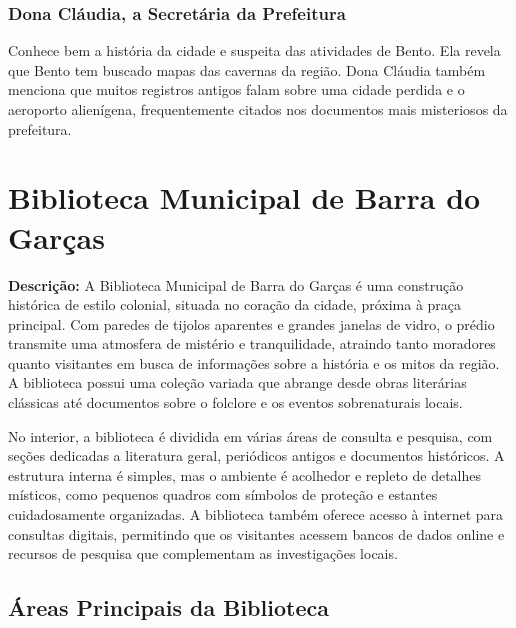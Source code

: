\begin{personagem}  
 \subsubsection{Dona Cláudia, a Secretária da Prefeitura}
 
 Conhece bem a história da cidade e suspeita das atividades de Bento. Ela revela que Bento tem buscado mapas das cavernas da região. Dona Cláudia também menciona que muitos registros antigos falam sobre uma cidade perdida e o aeroporto alienígena, frequentemente citados nos documentos mais misteriosos da prefeitura.
\end{personagem}
 
\section{Biblioteca Municipal de Barra do Garças}

\textbf{Descrição:}  
A Biblioteca Municipal de Barra do Garças é uma construção histórica de estilo colonial, situada no coração da cidade, próxima à praça principal. Com paredes de tijolos aparentes e grandes janelas de vidro, o prédio transmite uma atmosfera de mistério e tranquilidade, atraindo tanto moradores quanto visitantes em busca de informações sobre a história e os mitos da região. A biblioteca possui uma coleção variada que abrange desde obras literárias clássicas até documentos sobre o folclore e os eventos sobrenaturais locais.

No interior, a biblioteca é dividida em várias áreas de consulta e pesquisa, com seções dedicadas a literatura geral, periódicos antigos e documentos históricos. A estrutura interna é simples, mas o ambiente é acolhedor e repleto de detalhes místicos, como pequenos quadros com símbolos de proteção e estantes cuidadosamente organizadas. A biblioteca também oferece acesso à internet para consultas digitais, permitindo que os visitantes acessem bancos de dados online e recursos de pesquisa que complementam as investigações locais.

\subsection{Áreas Principais da Biblioteca}


